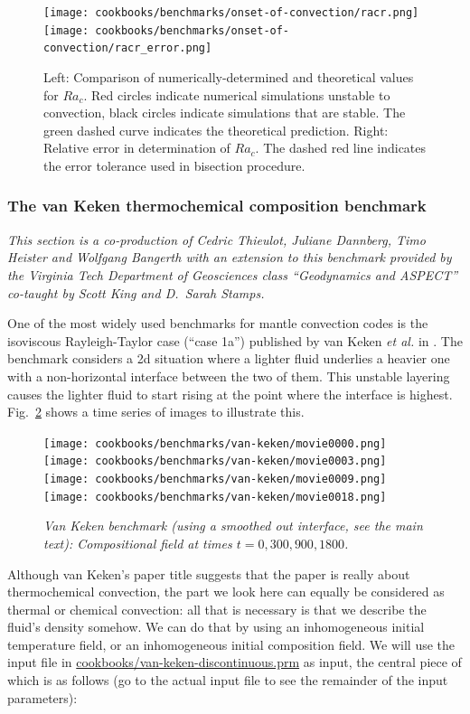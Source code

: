 \documentclass{article}
\begin{document}
\begin{figure}
 \texttt{[image: cookbooks/benchmarks/onset-of-convection/racr.png]}
 \hfill
 \texttt{[image: cookbooks/benchmarks/onset-of-convection/racr\_error.png]}
 \caption{Left: Comparison of numerically-determined and theoretical values for $Ra_c$. Red circles indicate numerical simulations unstable to convection, black circles indicate simulations that are stable. The green dashed curve indicates the theoretical prediction. Right: Relative error in determination of $Ra_c$. The dashed red line indicates the error tolerance used in bisection procedure.}
 \label{fig:onset-1}
\end{figure}

\subsubsection{The van Keken thermochemical composition benchmark}
\label{sec:benchmark-van-keken}

\textit{This section is a co-production of Cedric Thieulot, Juliane Dannberg,
Timo Heister and Wolfgang Bangerth with an extension to this benchmark provided by the Virginia Tech Department of Geosciences class ``Geodynamics and ASPECT'' co-taught by Scott King and D.~Sarah Stamps.}

One of the most widely used benchmarks for mantle convection codes is the
isoviscous Rayleigh-Taylor case (``case 1a'') published by van Keken \textit{et
al.} in \cite{KKSCND97}.
The benchmark considers a 2d situation where a lighter fluid underlies a heavier
one with a non-horizontal interface between the two of them. This unstable
layering causes the lighter fluid to start rising at the point where the
interface is highest. Fig.~\ref{fig:vk-1} shows a time series of images to
illustrate this.

\begin{figure}
  \texttt{[image: cookbooks/benchmarks/van-keken/movie0000.png]}
  \hfill
  \texttt{[image: cookbooks/benchmarks/van-keken/movie0003.png]}
  \hfill
  \texttt{[image: cookbooks/benchmarks/van-keken/movie0009.png]}
  \hfill
  \texttt{[image: cookbooks/benchmarks/van-keken/movie0018.png]}
  \caption{\it Van Keken benchmark (using a smoothed out interface, see the main
  text):
  Compositional field at times $t=0, 300, 900, 1800$.}
  \label{fig:vk-1}
\end{figure}


Although van Keken's paper title suggests that the paper is really about
thermochemical convection, the part we look here can equally be considered as
thermal or chemical convection: all that is necessary is that we describe the
fluid's density somehow. We can do that by using an inhomogeneous initial
temperature field, or an inhomogeneous initial composition field. We will use the
input file in \url{cookbooks/van-keken-discontinuous.prm} as input, the central
piece of which is as follows (go to the actual input file
to see the remainder of the input parameters):
\end{document}
